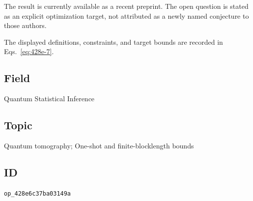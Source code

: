 The result is currently available as a recent preprint. The open question is stated as an explicit optimization target, not attributed as a newly named conjecture to those authors.

The displayed definitions, constraints, and target bounds are recorded in Eqs.~\eqref{eq:428e-7}.

\subsection*{Field}

Quantum Statistical Inference

\subsection*{Topic}

Quantum tomography; One-shot and finite-blocklength bounds

\subsection*{ID}

\texttt{op\_428e6c37ba03149a}
